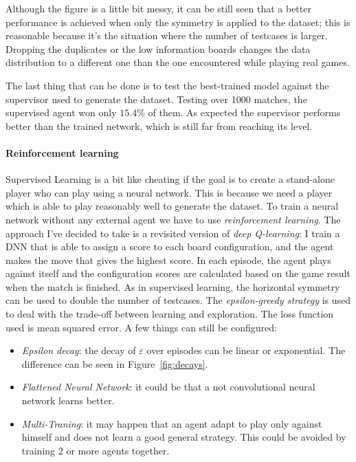 \documentclass{article}
\begin{document}
  Although the figure is a little bit messy, it can be still seen that a better performance is achieved when only the symmetry is applied to the dataset; this is reasonable because it's the situation where the number of testcases is larger. Dropping the duplicates or the low information boards changes the data distribution to a different one than the one encountered while playing real games. 
  
  The last thing that can be done is to test the best-trained model against the supervisor used to generate the dataset. Testing over 1000 matches, the supervised agent won only \(15.4\si{\percent}\) of them. As expected the supervisor performs better than the trained network, which is still far from reaching its level.
  
  \paragraph{Reinforcement learning}
  Supervised Learning is a bit like cheating if the goal is to create a stand-alone player who can play using a neural network. This is because we need a player which is able to play reasonably well to generate the dataset. To train a neural network without any external agent we have to use \emph{reinforcement learning}. The approach I've decided to take is a revisited version of \emph{deep Q-learning}: I train a DNN that is able to assign a score to each board configuration, and the agent makes the move that gives the highest score. In each episode, the agent plays against itself and the configuration scores are calculated based on the game result when the match is finished. As in supervised learning, the horizontal symmetry can be used to double the number of testcases. The \emph{epsilon-greedy strategy} is used to deal with the trade-off between learning and exploration. The loss function used is mean squared error. A few things can still be configured:
  \begin{itemize}
    \item \emph{Epsilon decay}: the decay of \(\varepsilon\) over episodes can be linear or exponential. The difference can be seen in Figure~\ref{fig:decays}. 
    \item \emph{Flattened Neural Network}: it could be that a not convolutional neural network learns better.
    \item \emph{Multi-Traning}: it may happen that an agent adapt to play only against himself and does not learn a good general strategy. This could be avoided by training 2 or more agents together.
  \end{itemize}
\end{document}
